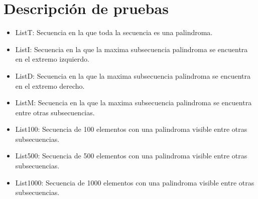 \documentclass{article}
\begin{document}
\section{Descripción de pruebas}
\begin{itemize}
\item ListT: Secuencia en la que toda la secuencia es una palindroma.
\item ListI: Secuencia en la que la maxima subsecuencia palindroma se encuentra en el extremo izquierdo.
\item ListD: Secuencia en la que la maxima subsecuencia palindroma se encuentra en el extremo derecho.
\item ListM: Secuencia en la que la maxima subsecuencia palindroma se encuentra entre otras subsecuencias.
\item List100: Secuencia de 100 elementos con una palindroma visible entre otras subsecuencias.
\item List500: Secuencia de 500 elementos con una palindroma visible entre otras subsecuencias.
\item List1000: Secuencia de 1000 elementos con una palindroma visible entre otras subsecuencias.
\end{itemize}
\end{document}
